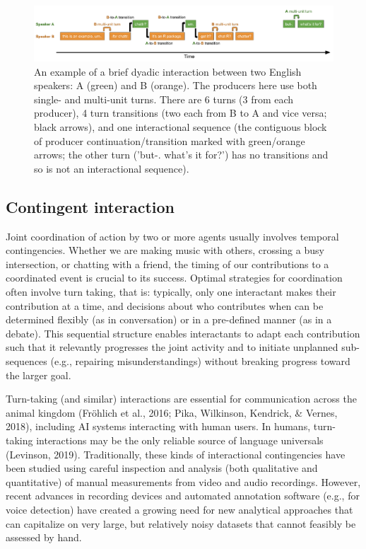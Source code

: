 \documentclass[10pt, letterpaper]{article}
\newenvironment{CodeChunk}{}{}
\begin{document}
\begin{CodeChunk}
\begin{figure}[h]

{\centering \includegraphics{figs/minisequence-1} 

}

\caption[An example of a brief dyadic interaction between two English speakers]{An example of a brief dyadic interaction between two English speakers: A (green) and B (orange). The producers here use both single- and multi-unit turns. There are 6 turns (3 from each producer), 4 turn transitions (two each from B to A and vice versa; black arrows), and one interactional sequence (the contiguous block of producer continuation/transition marked with green/orange arrows; the other turn ('but-. what's it for?') has no transitions and so is not an interactional sequence).}\label{fig:minisequence}
\end{figure}
\end{CodeChunk}

\hypertarget{contingent-interaction}{%
\subsection{Contingent interaction}\label{contingent-interaction}}

Joint coordination of action by two or more agents usually involves
temporal contingencies. Whether we are making music with others,
crossing a busy intersection, or chatting with a friend, the timing of
our contributions to a coordinated event is crucial to its success.
Optimal strategies for coordination often involve turn taking, that is:
typically, only one interactant makes their contribution at a time, and
decisions about who contributes when can be determined flexibly (as in
conversation) or in a pre-defined manner (as in a debate). This
sequential structure enables interactants to adapt each contribution
such that it relevantly progresses the joint activity and to initiate
unplanned sub-sequences (e.g., repairing misunderstandings) without
breaking progress toward the larger goal.

Turn-taking (and similar) interactions are essential for communication
across the animal kingdom (Fröhlich et al., 2016; Pika, Wilkinson,
Kendrick, \& Vernes, 2018), including AI systems interacting with human
users. In humans, turn-taking interactions may be the only reliable
source of language universals (Levinson, 2019). Traditionally, these
kinds of interactional contingencies have been studied using careful
inspection and analysis (both qualitative and quantitative) of manual
measurements from video and audio recordings. However, recent advances
in recording devices and automated annotation software (e.g., for voice
detection) have created a growing need for new analytical approaches
that can capitalize on very large, but relatively noisy datasets that
cannot feasibly be assessed by hand.
\end{document}
